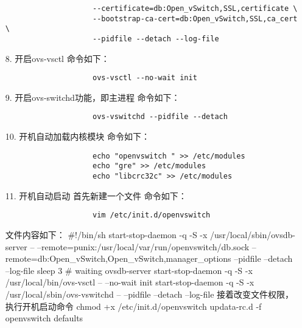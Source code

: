 \documentclass[a4paper,left=1.5cm,right=1.5cm,11pt]{article}
\begin{document}
\begin{itemize}
\begin{lstlisting}
					--certificate=db:Open_vSwitch,SSL,certificate \
					--bootstrap-ca-cert=db:Open_vSwitch,SSL,ca_cert \
					--pidfile --detach --log-file
				 \end{lstlisting}
		\item[8.]开启ovs-vsctl
				命令如下：
				 \begin{lstlisting}
					ovs-vsctl --no-wait init
				 \end{lstlisting}
		\item[9.]开启ovs-switchd功能，即主进程
				命令如下：
				 \begin{lstlisting}
					ovs-vswitchd --pidfile --detach
				 \end{lstlisting}
		\item[10.]开机自动加载内核模块
				命令如下：
				 \begin{lstlisting}
					echo "openvswitch " >> /etc/modules
					echo "gre" >> /etc/modules
					echo "libcrc32c" >> /etc/modules
				 \end{lstlisting}
		\item[11.]开机自动启动
				首先新建一个文件
				命令如下：
				 \begin{lstlisting}
					vim /etc/init.d/openvswitch
				 \end{lstlisting}
				文件内容如下：
				#!/bin/sh
				start-stop-daemon -q -S -x /usr/local/sbin/ovsdb-server -- --remote=punix:/usr/local/var/run/openvswitch/db.sock --remote=db:Open_vSwitch,Open_vSwitch,manager_options --pidfile --detach --log-file
				sleep 3 # waiting ovsdb-server 
				start-stop-daemon -q -S -x /usr/local/bin/ovs-vsctl -- --no-wait init
				start-stop-daemon -q -S -x /usr/local/sbin/ovs-vswitchd -- --pidfile --detach --log-file
				接着改变文件权限，执行开机启动命令
				chmod +x /etc/init.d/openvswitch
				updata-rc.d -f openvswitch defaults
	\end{itemize}
\end{document}
